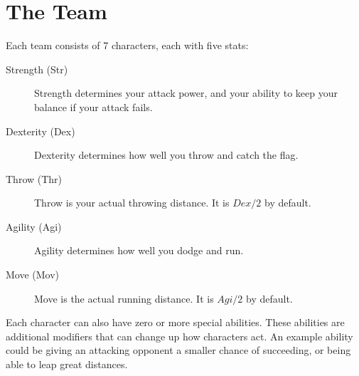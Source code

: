 \section{The Team} \label{the-team}
Each team consists of 7 characters, each with five stats:

\begin{description}
    \item[Strength (Str)] Strength determines your attack power, and your ability to keep your balance if your attack fails.
    \item[Dexterity (Dex)] Dexterity determines how well you throw and catch the flag.
    \item[Throw (Thr)] Throw is your actual throwing distance. It is $Dex/2$ by default.
    \item[Agility (Agi)] Agility determines how well you dodge and run.
    \item[Move (Mov)] Move is the actual running distance. It is $Agi / 2$ by default.
\end{description}
Each character can also have zero or more special abilities. 
These abilities are additional modifiers that can change up how characters act. 
An example ability could be giving an attacking opponent a smaller chance of succeeding, or being able to leap great distances.
